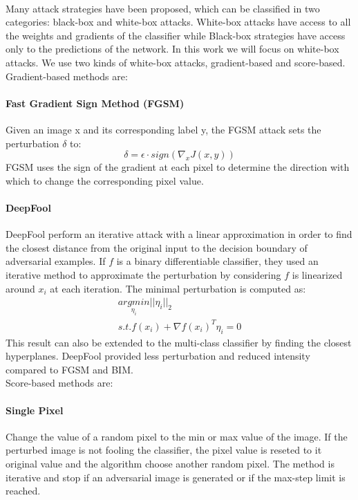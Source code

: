 \documentclass[12pt]{article}
\begin{document}
\paragraph{}
Many attack strategies have been proposed, which can be classified in two categories: black-box and white-box attacks. White-box attacks have access to all the weights and gradients of the
classifier while Black-box strategies have access only to the predictions of the network. In this work we will focus on white-box attacks. We use two kinds of white-box attacks, gradient-based and score-based. Gradient-based methods are:

\paragraph{Fast Gradient Sign Method (FGSM)}
Given an image x and its corresponding label y, the FGSM attack sets the perturbation $\delta$ to:
\begin{equation}\label{eq:fgsm}
\delta = \epsilon \cdot sign(\nabla_{x}J(x,y))
\end{equation}
FGSM \cite{goodfellow_explaining_2014} uses the sign of the gradient at each pixel to determine the direction with which to change the corresponding pixel value.


\paragraph{DeepFool}
DeepFool \cite{moosavi-dezfooli_deepfool:_2015} perform an iterative attack with a linear approximation in order to find the closest distance from the original input to the decision boundary of adversarial examples. If $f$ is a binary differentiable classifier, they used an iterative
method to approximate the perturbation by considering $f$ is linearized around $x_{i}$ at each iteration. The minimal perturbation is computed as:
\begin{equation}\label{eq:deepfool}
\begin{multlined}
\underset{\eta_{i}}{arg min} ||\eta_{i}||_{2} \\
s.t. f(x_{i}) + \nabla f(x_{i})^{T} \eta_{i} = 0
\end{multlined} 
\end{equation}
This result can also be extended to the multi-class classifier by finding the closest hyperplanes.
DeepFool provided less perturbation and reduced intensity compared to FGSM and BIM.
\\
Score-based methods are:
\paragraph{Single Pixel}
Change the value of a random pixel to the min or max value of the image. If the perturbed image is not fooling the classifier, the pixel value is reseted to it original value and the algorithm choose another random pixel. The method is iterative and stop if an adversarial image is generated or if the max-step limit is reached.
\end{document}
